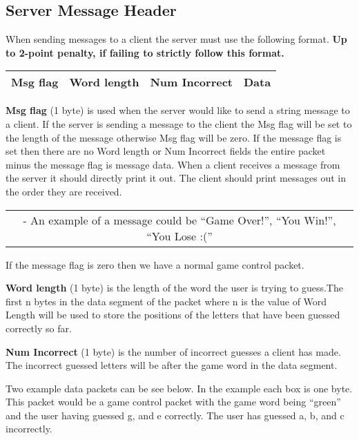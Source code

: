 \documentclass[12pt]{article}
\begin{document}
\subsection{Server Message Header}\label{subsec:serverMessageHeader}

When sending messages to a client the server must use the following format. {\bf Up to 2-point penalty, if failing to strictly follow this format.}

\begin{center}\begin{tabular}{|p{3cm}|p{3cm}|p{3cm}|p{3cm}|}
\hline
Msg flag & Word length & Num Incorrect & Data\\\hline
\end{tabular}\end{center}

\noindent
{\bf Msg flag} (1 byte) is used when the server would like to send a string message to a client. If the
server is sending a message to the client the Msg flag will be set to the length of the message
otherwise Msg flag will be zero. If the message flag is set then there are no Word length or Num
Incorrect fields the entire packet minus the message flag is message data. When a client
receives a message from the server it should directly print it out. The client should print
messages out in the order they are received.
\medskip
\begin{center}
\begin{tabular}{c}
- An example of a message could be ``Game Over!'', ``You Win!'', ``You Lose :(''
\end{tabular}
\end{center}
\medskip
If the message flag is zero then we have a normal game control packet.

\noindent
{\bf Word length} (1 byte) is the length of the word the user is trying to guess.The first n bytes in the
data segment of the packet where n is the value of Word Length will be used to store the
positions of the letters that have been guessed correctly so far.

\noindent
{\bf Num Incorrect} (1 byte) is the number of incorrect guesses a client has made. The incorrect
guessed letters will be after the game word in the data segment.


Two example data packets can be see below. In the example each box is one byte.
This packet would be a game control packet with the game word being ``green'' and the user
having guessed g, and e correctly. The user has guessed a, b, and c incorrectly.
\end{document}
